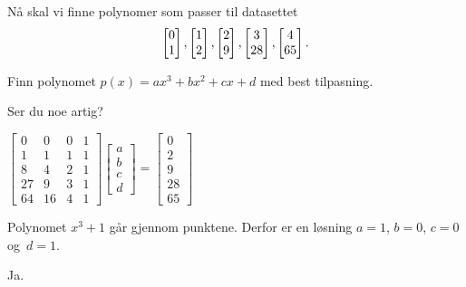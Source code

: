 \begin{oppgave}
Nå skal vi finne polynomer som passer til datasettet 
$$\begin{bmatrix} 0 \\ 1 \end{bmatrix}, \begin{bmatrix} 1 \\ 2 \end{bmatrix}, \begin{bmatrix} 2 \\ 9 \end{bmatrix},\begin{bmatrix} 3 \\ 28 \end{bmatrix},\begin{bmatrix} 4 \\ 65 \end{bmatrix}.$$ 
\begin{punkt}
Finn polynomet $p(x)=ax^3+bx^2+cx+d$ med best tilpasning.
\end{punkt}

\begin{punkt}
Ser du noe artig?
\end{punkt}

\end{oppgave}

\begin{losning}

\begin{punkt}
$
\begin{bmatrix}
0 & 0 & 0 & 1\\
1 & 1 & 1 & 1\\
8 & 4 & 2 & 1\\
27 & 9 & 3 & 1\\
64 & 16 & 4 & 1
\end{bmatrix}\begin{bmatrix}
a\\
b\\
c\\
d
\end{bmatrix}=\begin{bmatrix}
0\\
2\\
9\\
28\\
65
\end{bmatrix}$
\end{punkt}

\begin{punkt}
Polynomet $x^3+1$ går gjennom punktene. Derfor er en løsning $a=1$, $b=0$, $c=0$ og~$d=1$.
\end{punkt}

\begin{punkt}
Ja.
\end{punkt}

\end{losning}

%
%


